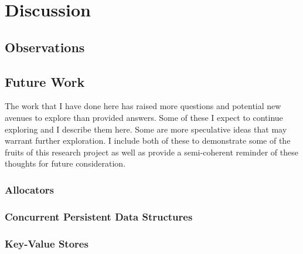 
\chapter{Discussion}
\label{ch:Discussion}

\section{Observations}

\section{Future Work}

The work that I have done here has raised more questions and potential new avenues to explore than provided answers.  Some of these I expect to continue exploring and I describe them here.  Some are more speculative ideas that may warrant further exploration.  I include both of these to demonstrate some of the fruits of this research project as well as provide a semi-coherent reminder of these thoughts for future consideration.

\subsection{Allocators}

\subsection{Concurrent Persistent Data Structures}

\subsection{Key-Value Stores}



